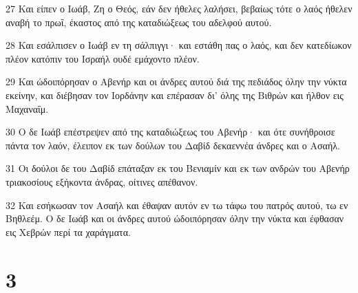 \par 27 Και είπεν ο Ιωάβ, Ζη ο Θεός, εάν δεν ήθελες λαλήσει, βεβαίως τότε ο λαός ήθελεν αναβή το πρωΐ, έκαστος από της καταδιώξεως του αδελφού αυτού.
\par 28 Και εσάλπισεν ο Ιωάβ εν τη σάλπιγγι· και εστάθη πας ο λαός, και δεν κατεδίωκον πλέον κατόπιν του Ισραήλ ουδέ εμάχοντο πλέον.
\par 29 Και ώδοιπόρησαν ο Αβενήρ και οι άνδρες αυτού διά της πεδιάδος όλην την νύκτα εκείνην, και διέβησαν τον Ιορδάνην και επέρασαν δι' όλης της Βιθρών και ήλθον εις Μαχαναΐμ.
\par 30 Ο δε Ιωάβ επέστρεψεν από της καταδιώξεως του Αβενήρ· και ότε συνήθροισε πάντα τον λαόν, έλειπον εκ των δούλων του Δαβίδ δεκαεννέα άνδρες και ο Ασαήλ.
\par 31 Οι δούλοι δε του Δαβίδ επάταξαν εκ του Βενιαμίν και εκ των ανδρών του Αβενήρ τριακοσίους εξήκοντα άνδρας, οίτινες απέθανον.
\par 32 Και εσήκωσαν τον Ασαήλ και έθαψαν αυτόν εν τω τάφω του πατρός αυτού, τω εν Βηθλεέμ. Ο δε Ιωάβ και οι άνδρες αυτού ώδοιπόρησαν όλην την νύκτα και έφθασαν εις Χεβρών περί τα χαράγματα.

\chapter{3}

